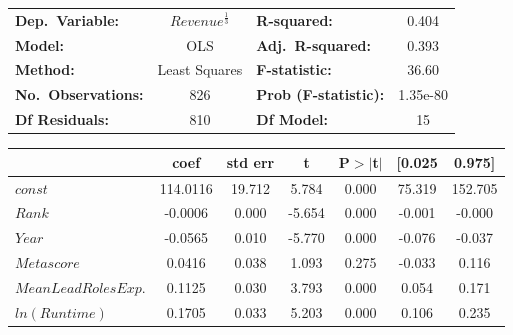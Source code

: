         \begin{table}[H]
            \begin{center}
                \begin{tabular}{lclc}
                    \toprule
                    \textbf{Dep.~Variable:}    & $Revenue^{\frac{1}{3}}$ & \textbf{  R-squared:         } & 0.404    \\
                    \textbf{Model:}            & OLS                     & \textbf{  Adj.~R-squared:    } & 0.393    \\
                    \textbf{Method:}           & Least Squares           & \textbf{  F-statistic:       } & 36.60    \\
                    \textbf{No.~Observations:} & 826                     & \textbf{  Prob (F-statistic):} & 1.35e-80 \\
                    \textbf{Df Residuals:}     & 810                     & \textbf{Df Model:}             & 15       \\
                    \bottomrule
                \end{tabular}
                \begin{tabular}{lcccccc}
                                                    & \textbf{coef} & \textbf{std err} & \textbf{t} & \textbf{P$> |$t$|$} & \textbf{[0.025} & \textbf{0.975]} \\
                    \midrule
                    \textbf{$const$}                & 114.0116      & 19.712           & 5.784      & 0.000               & 75.319          & 152.705         \\
                    \textbf{$Rank$}                 & -0.0006       & 0.000            & -5.654     & 0.000               & -0.001          & -0.000          \\
                    \textbf{$Year$}                 & -0.0565       & 0.010            & -5.770     & 0.000               & -0.076          & -0.037          \\
                    \textbf{$Metascore$}            & 0.0416        & 0.038            & 1.093      & 0.275               & -0.033          & 0.116           \\
                    \textbf{$Mean Lead Roles Exp.$} & 0.1125        & 0.030            & 3.793      & 0.000               & 0.054           & 0.171           \\
                    \textbf{$ln(Runtime)$}          & 0.1705        & 0.033            & 5.203      & 0.000               & 0.106           & 0.235           \\

\end{tabular}
\end{center}
\end{table}
